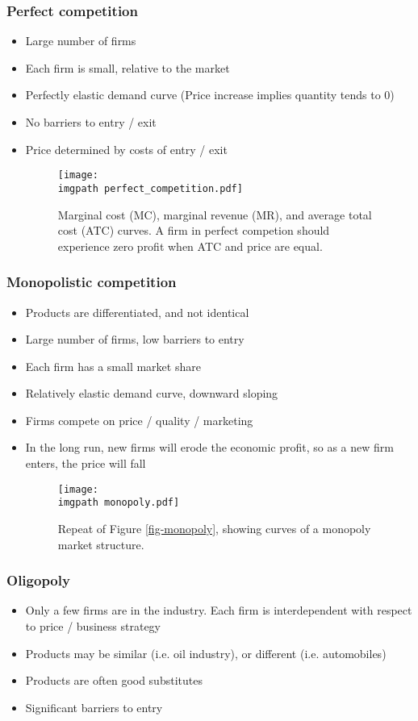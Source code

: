 \documentclass[../notes_compiled.tex]{subfiles}
\begin{document}
\subsubsection{Perfect competition}
\begin{itemize}
\item Large number of firms
\item Each firm is small, relative to the market
\item Perfectly elastic demand curve (Price increase implies quantity tends to 0)
\item No barriers to entry / exit
\item Price determined by costs of entry / exit

\begin{figure}[h]
  \centering
  \texttt{[image: \\imgpath perfect\_competition.pdf]}
  \caption{Marginal cost (MC), marginal revenue (MR), and average total cost (ATC) curves. A firm in perfect competion should experience zero profit when ATC and price are equal.}
\end{figure}
\end{itemize}


\subsubsection{Monopolistic competition}
\begin{itemize}
\item Products are differentiated, and not identical
\item Large number of firms, low barriers to entry
\item Each firm has a small market share
\item Relatively elastic demand curve, downward sloping
\item Firms compete on price / quality / marketing
\item In the long run, new firms will erode the economic profit, so as a new firm enters, the price will fall

\begin{figure}[h]
  \centering
  \texttt{[image: \\imgpath monopoly.pdf]}
  \caption*{Repeat of Figure \ref{fig-monopoly}, showing curves of a monopoly market structure.}
\end{figure}
\end{itemize}

\subsubsection{Oligopoly}
\begin{itemize}
\item Only a few firms are in the industry. Each firm is interdependent with respect to price / business strategy
\item Products may be similar (i.e. oil industry), or different (i.e. automobiles)
\item Products are often good substitutes
\item Significant barriers to entry
\end{itemize}
\end{document}

